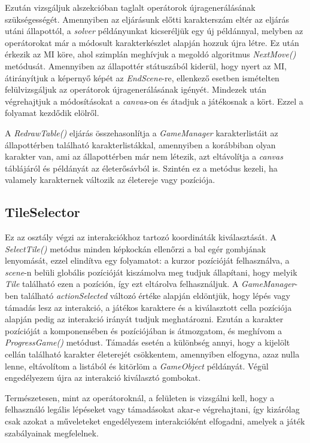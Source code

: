 \documentclass[
]{thesis-ekf}
\theoremstyle{definition}
\theoremstyle{remark}
\begin{document}
Ezután vizsgáljuk  alszekcióban taglalt operátorok újragenerálásának szükségességét. Amennyiben az eljárásunk előtti karakterszám eltér az eljárás utáni állapottól, a \emph{solver} példányunkat kicseréljük egy új példánnyal, melyben az operátorokat már a módosult karakterkészlet alapján hozzuk újra létre. Ez után érkezik az MI köre, ahol szimplán meghívjuk a megoldó algoritmus \emph{NextMove()} metódusát. Amennyiben az állapottér státuszából kiderül, hogy nyert az MI, átirányítjuk a képernyő képét az \emph{EndScene}-re, ellenkező esetben ismételten felülvizsgáljuk az operátorok újragenerálásának igényét. Mindezek után végrehajtjuk a módosításokat a \emph{canvas}-on és átadjuk a játékosnak a kört. Ezzel a folyamat kezdődik elölről.

A \emph{RedrawTable()} eljárás összehasonlítja a \emph{GameManager} karakterlistáit az állapottérben található karakterlistákkal, amennyiben a korábbiban olyan karakter van, ami az állapottérben már nem létezik, azt eltávolítja a \emph{canvas} táblájáról és példányát az életerősávból is. Szintén ez a metódus kezeli, ha valamely karakternek változik az életereje vagy pozíciója.

\subsection{TileSelector} \label{tileselector}

Ez az osztály végzi az interakciókhoz tartozó koordináták kiválasztását. A \emph{SelectTile()} metódus minden képkockán ellenőrzi a bal egér gombjának lenyomását, ezzel elindítva egy folyamatot: a kurzor pozícióját felhasználva, a \emph{scene}-n belüli globális pozícióját kiszámolva meg tudjuk állapítani, hogy melyik \emph{Tile} található ezen a pozíción, így ezt eltárolva felhasználjuk. A \emph{GameManager}-ben található \emph{actionSelected} változó értéke alapján eldöntjük, hogy lépés vagy támadás lesz az interakció, a játékos karaktere és a kiválasztott cella pozíciója alapján pedig az interakció irányát tudjuk meghatározni. Ezután a karakter pozícióját a komponensében és pozíciójában is átmozgatom, és meghívom a \emph{ProgressGame()} metódust. Támadás esetén a különbség annyi, hogy a kijelölt cellán található karakter életerejét csökkentem, amennyiben elfogyna, azaz nulla lenne, eltávolítom a listából és kitörlöm a \emph{GameObject} példányát. Végül engedélyezem újra az interakció kiválasztó gombokat.

Természetesen, mint az operátoroknál, a felületen is vizsgálni kell, hogy a felhasználó legális lépéseket vagy támadásokat akar-e végrehajtani, így kizárólag csak azokat a műveleteket engedélyezem interakcióként elfogadni, amelyek a játék szabályainak megfelelnek.
\end{document}
